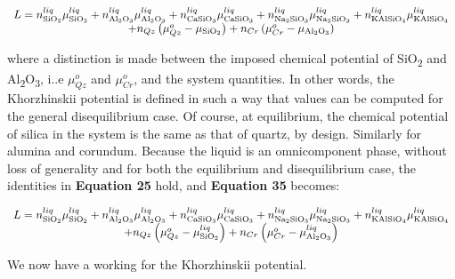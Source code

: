 \documentclass[11pt, titlepage, twoside]{article}
\begin{document}
\begin{MPEquation}[!ht]
\begin{equation}
\begin{array}{c}
L = n_{{\rm{Si}}{{\rm{O}}_2}}^{liq}\mu _{{\rm{Si}}{{\rm{O}}_2}}^{liq} + n_{{\rm{A}}{{\rm{l}}_2}{{\rm{O}}_3}}^{liq}\mu _{{\rm{A}}{{\rm{l}}_2}{{\rm{O}}_3}}^{liq} + n_{{\rm{CaSi}}{{\rm{O}}_3}}^{liq}\mu _{{\rm{CaSi}}{{\rm{O}}_3}}^{liq} + n_{{\rm{N}}{{\rm{a}}_{\rm{2}}}{\rm{Si}}{{\rm{O}}_3}}^{liq}\mu _{{\rm{N}}{{\rm{a}}_{\rm{2}}}{\rm{Si}}{{\rm{O}}_3}}^{liq} + n_{{\rm{KAlSi}}{{\rm{O}}_4}}^{liq}\mu _{{\rm{KAlSi}}{{\rm{O}}_4}}^{liq}\\
 + {n_{Qz}}\left( {\mu _{Qz}^o - {\mu _{{\rm{Si}}{{\rm{O}}_2}}}} \right) + {n_{Cr}}\left( {\mu _{Cr}^o - {\mu _{{\rm{A}}{{\rm{l}}_2}{{\rm{O}}_3}}}} \right)
\end{array}
\end{equation}
\label{MPEquationElement:0CA130F1-480A-4CD3-8586-7D0CE3A4539C}
\end{MPEquation}
where a distinction is made between the imposed chemical potential of SiO\textsubscript{2} and Al\textsubscript{2}O\textsubscript{3}, i..e ${\mu _{Qz}^o}$ and ${\mu _{Cr}^o}$, and the system quantities. In other words, the Khorzhinskii potential is defined in such a way that values can be computed for the general disequilibrium case. Of course, at equilibrium, the chemical potential of silica in the system is the same as that of quartz, by design. Similarly for alumina and corundum. Because the liquid is an omnicomponent phase, without loss of generality and for both the equilibrium and disequilibrium case, the identities in \textbf{Equation 25} hold, and \textbf{Equation 35} becomes:


\begin{MPEquation}[!ht]
\begin{equation}
\begin{array}{c}
L = n_{{\rm{Si}}{{\rm{O}}_2}}^{liq}\mu _{{\rm{Si}}{{\rm{O}}_2}}^{liq} + n_{{\rm{A}}{{\rm{l}}_2}{{\rm{O}}_3}}^{liq}\mu _{{\rm{A}}{{\rm{l}}_2}{{\rm{O}}_3}}^{liq} + n_{{\rm{CaSi}}{{\rm{O}}_3}}^{liq}\mu _{{\rm{CaSi}}{{\rm{O}}_3}}^{liq} + n_{{\rm{N}}{{\rm{a}}_{\rm{2}}}{\rm{Si}}{{\rm{O}}_3}}^{liq}\mu _{{\rm{N}}{{\rm{a}}_{\rm{2}}}{\rm{Si}}{{\rm{O}}_3}}^{liq} + n_{{\rm{KAlSi}}{{\rm{O}}_4}}^{liq}\mu _{{\rm{KAlSi}}{{\rm{O}}_4}}^{liq}\\
 + {n_{Qz}}\left( {\mu _{Qz}^o - \mu _{{\rm{Si}}{{\rm{O}}_2}}^{liq}} \right) + {n_{Cr}}\left( {\mu _{Cr}^o - \mu _{{\rm{A}}{{\rm{l}}_2}{{\rm{O}}_3}}^{liq}} \right)
\end{array}
\end{equation}
\label{MPEquationElement:F297C776-129E-4242-E714-8A2ED0D93368}
\end{MPEquation}
We now have a working for the Khorzhinskii potential.
\end{document}
